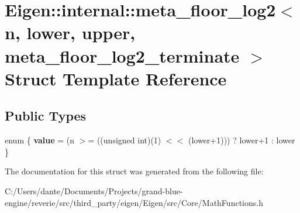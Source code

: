 \hypertarget{struct_eigen_1_1internal_1_1meta__floor__log2_3_01n_00_01lower_00_01upper_00_01meta__floor__log2__terminate_01_4}{}\section{Eigen\+::internal\+::meta\+\_\+floor\+\_\+log2$<$ n, lower, upper, meta\+\_\+floor\+\_\+log2\+\_\+terminate $>$ Struct Template Reference}
\label{struct_eigen_1_1internal_1_1meta__floor__log2_3_01n_00_01lower_00_01upper_00_01meta__floor__log2__terminate_01_4}
\subsection*{Public Types}
\begin{DoxyCompactItemize}
\item 
\mbox{\label{struct_eigen_1_1internal_1_1meta__floor__log2_3_01n_00_01lower_00_01upper_00_01meta__floor__log2__terminate_01_4_ab47f1c50e81a69ecbb0ee8eea0c140d9}} 
enum \{ {\bfseries value} = (n $>$= ((unsigned int)(1) $<$$<$ (lower+1))) ? lower+1 \+: lower
 \}
\end{DoxyCompactItemize}


The documentation for this struct was generated from the following file\+:\begin{DoxyCompactItemize}
\item 
C\+:/\+Users/dante/\+Documents/\+Projects/grand-\/blue-\/engine/reverie/src/third\+\_\+party/eigen/\+Eigen/src/\+Core/Math\+Functions.\+h\end{DoxyCompactItemize}
